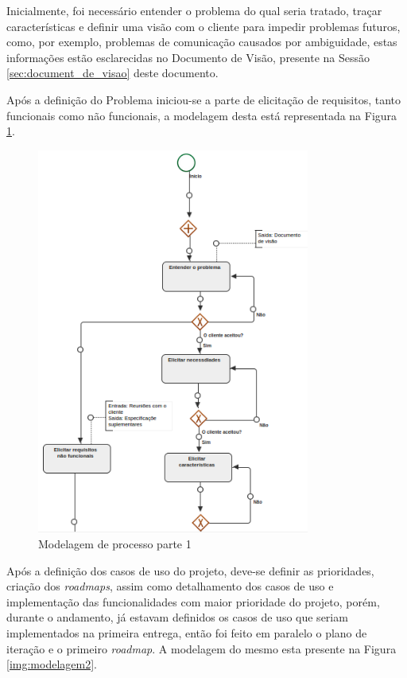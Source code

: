 
Inicialmente, foi necessário entender o problema do qual seria tratado, traçar características e definir uma visão com o cliente para impedir problemas futuros, como, por exemplo, problemas de comunicação causados por ambiguidade, estas informações estão esclarecidas no Documento de Visão, presente na Sessão \ref{sec:document_de_visao} deste documento.

Após a definição do Problema iniciou-se a parte de elicitação de requisitos, tanto funcionais como não funcionais, a modelagem desta está representada na Figura \ref{img:modelagem1}.

\begin{figure}[H]
	\centering
	\includegraphics[width=0.8\textwidth]{imgModelagem/modelagem1}
	\caption{Modelagem de processo parte 1}
	\label{img:modelagem1}
\end{figure}


Após a definição dos casos de uso do projeto, deve-se definir as prioridades, criação dos \textit{roadmaps}, assim como detalhamento dos casos de uso e implementação das funcionalidades com maior prioridade do projeto, porém, durante o andamento, já estavam definidos os casos de uso que seriam implementados na primeira entrega, então foi feito em paralelo o plano de iteração e o primeiro \textit{roadmap}. A modelagem do mesmo esta presente na Figura \ref{img:modelagem2}.

